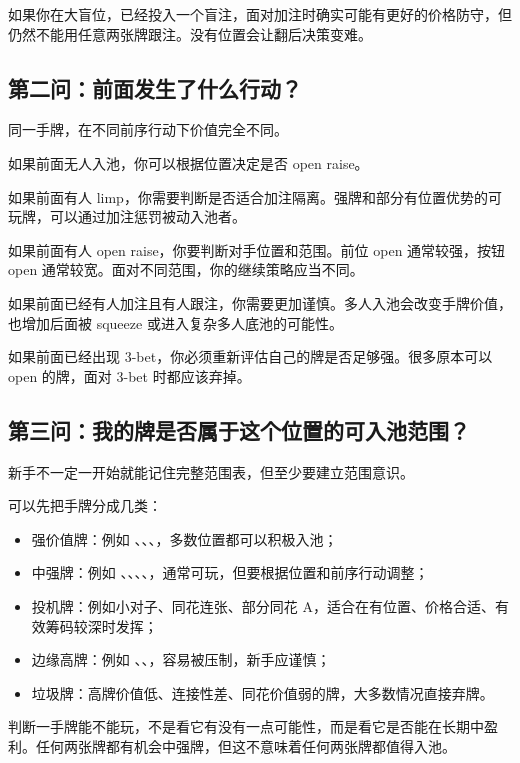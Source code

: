 如果你在大盲位，已经投入一个盲注，面对加注时确实可能有更好的价格防守，但仍然不能用任意两张牌跟注。没有位置会让翻后决策变难。

\subsection{第二问：前面发生了什么行动？}

同一手牌，在不同前序行动下价值完全不同。

如果前面无人入池，你可以根据位置决定是否 open raise。

如果前面有人 limp，你需要判断是否适合加注隔离。强牌和部分有位置优势的可玩牌，可以通过加注惩罚被动入池者。

如果前面有人 open raise，你要判断对手位置和范围。前位 open 通常较强，按钮 open 通常较宽。面对不同范围，你的继续策略应当不同。

如果前面已经有人加注且有人跟注，你需要更加谨慎。多人入池会改变手牌价值，也增加后面被 squeeze 或进入复杂多人底池的可能性。

如果前面已经出现 3-bet，你必须重新评估自己的牌是否足够强。很多原本可以 open 的牌，面对 3-bet 时都应该弃掉。

\subsection{第三问：我的牌是否属于这个位置的可入池范围？}

新手不一定一开始就能记住完整范围表，但至少要建立范围意识。

可以先把手牌分成几类：

\begin{itemize}
\item 强价值牌：例如 、、、，多数位置都可以积极入池；
\item 中强牌：例如 、、、、，通常可玩，但要根据位置和前序行动调整；
\item 投机牌：例如小对子、同花连张、部分同花 A，适合在有位置、价格合适、有效筹码较深时发挥；
\item 边缘高牌：例如 、、，容易被压制，新手应谨慎；
\item 垃圾牌：高牌价值低、连接性差、同花价值弱的牌，大多数情况直接弃牌。
\end{itemize}

判断一手牌能不能玩，不是看它有没有一点可能性，而是看它是否能在长期中盈利。任何两张牌都有机会中强牌，但这不意味着任何两张牌都值得入池。

